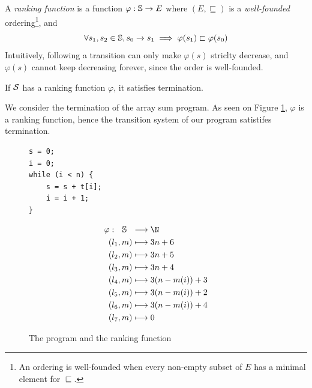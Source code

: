 \documentclass[toc]{../cs-classes/cs-classes}
\begin{document}
\begin{definition}
    A \emph{ranking function} is a function $\varphi:\S\to E$ where $(E, \sqsubseteq)$ is a \emph{well-founded} ordering\footnote{An ordering is well-founded when every non-empty subset of $E$ has a minimal element for $\sqsubseteq$.}, and
    \begin{equation*}
        \forall s_1, s_2\in\S, s_0\to s_1 \implies \varphi(s_1) \sqsubset \varphi(s_0)
    \end{equation*}
    Intuitively, following a transition can only make $\varphi(s)$ striclty decrease, and $\varphi(s)$ cannot keep decreasing forever, since the order is well-founded.
\end{definition}

\begin{theorem}
    If $\Sc$ has a ranking function $\varphi$, it satisfies termination.
\end{theorem}

\begin{example}
    We consider the termination of the array sum program. As seen on Figure \ref{fig:ranking-function}, $\varphi$ is a ranking function, hence the transition system of our program satistifes termination.
    \begin{figure}[!ht]
        \label{fig:ranking-function}
        \centering
        \begin{minipage}{0.2\textwidth}
            \baselineskip
            \centering
            \begin{verbatim}
s = 0;
i = 0;
while (i < n) {
    s = s + t[i];
    i = i + 1;
}
            \end{verbatim}
        \end{minipage}
        \begin{minipage}{.4\textwidth}
          \begin{equation*}
            \begin{aligned}
                \varphi : \:\:\: \S \:\:\: &\longrightarrow \N\\
                (l_1, m) &\longmapsto 3n+6\\
                (l_2, m) &\longmapsto 3n+5\\
                (l_3, m) &\longmapsto 3n+4\\
                (l_4, m) &\longmapsto 3(n-m(i))+3\\
                (l_5, m) &\longmapsto 3(n-m(i))+2\\
                (l_6, m) &\longmapsto 3(n-m(i))+4\\
                (l_7, m) &\longmapsto 0\\
            \end{aligned}
          \end{equation*}
        \end{minipage}
        \caption{The program and the ranking function}
    \end{figure}
\end{example}
\end{document}
